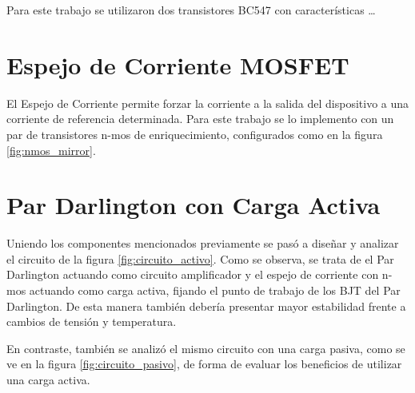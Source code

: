 Para este trabajo se utilizaron dos transistores BC547 con características \dots

\section{Espejo de Corriente MOSFET}

El Espejo de Corriente permite forzar la corriente a la salida del dispositivo a una corriente de referencia determinada. Para este trabajo se lo implemento con un par de transistores n-mos de enriquecimiento, configurados como en la figura \ref{fig:nmos_mirror}.

\section{Par Darlington con Carga Activa}
Uniendo los componentes mencionados previamente se pasó a diseñar y analizar el circuito de la figura \ref{fig:circuito_activo}. Como se observa, se trata de el Par Darlington actuando como circuito amplificador y el espejo de corriente con n-mos actuando como carga activa, fijando el punto de trabajo de los BJT del Par Darlington. De esta manera también debería presentar mayor estabilidad frente a cambios de tensión y temperatura.

En contraste, también se analizó el mismo circuito con una carga pasiva, como se ve en la figura \ref{fig:circuito_pasivo}, de forma de evaluar los beneficios de utilizar una carga activa.


